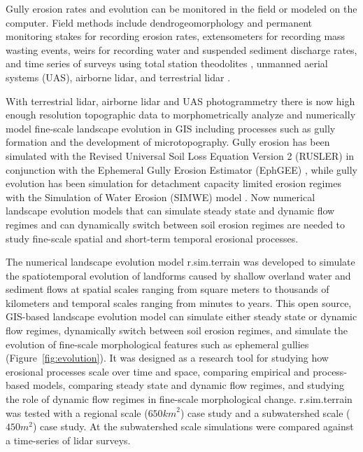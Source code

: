 \documentclass[esurf, manuscript]{copernicus}
\begin{document}
Gully erosion rates and evolution
can be monitored in the field 
or modeled on the computer. 
Field methods include
dendrogeomorphology \citep{Malik2008} and 
permanent monitoring stakes for recording erosion rates, 
extensometers for recording mass wasting events, 
weirs for recording water and suspended sediment discharge rates, 
and time series of surveys using 
total station theodolites \citep{Thomas2004},
unmanned aerial systems (UAS),
airborne lidar, and terrestrial lidar \citep{Starek2011,Bechet2016}.

With terrestrial lidar, airborne lidar and 
UAS photogrammetry
there is now high enough resolution topographic data 
to morphometrically analyze and 
numerically model fine-scale landscape evolution in GIS
including processes such as gully formation 
and the development of microtopography. 
Gully erosion has been simulated with 
the Revised Universal Soil Loss Equation Version 2 (RUSLER)
in conjunction with the Ephemeral Gully Erosion Estimator (EphGEE)
\citep{Dabney2014},
while gully evolution
has been simulation for detachment capacity limited erosion regimes
with the Simulation of Water Erosion (SIMWE) model
\citep{Koco2011, Mitasova2013}. 
Now numerical landscape evolution models 
that can simulate 
steady state and dynamic flow regimes
and can dynamically switch between soil erosion regimes 
are needed to study 
fine-scale spatial and short-term temporal erosional processes.

The numerical landscape evolution model 
\lowercase{r.sim.terrain} was developed to 
simulate the spatiotemporal evolution of landforms
caused by shallow overland water and sediment flows
at spatial scales ranging from
square meters to thousands of kilometers
and temporal scales ranging from minutes to years. 
This open source, GIS-based landscape evolution model can
simulate either steady state or dynamic flow regimes, 
dynamically switch between soil erosion regimes, and
simulate the evolution of fine-scale morphological features 
such as ephemeral gullies
(Figure~\ref{fig:evolution}).
It was designed as a research tool for
studying how erosional processes scale over time and space,
comparing empirical and process-based models, 
comparing steady state and dynamic flow regimes, and
studying the role of dynamic flow regimes in fine-scale morphological change. 
\lowercase{r.sim.terrain} was tested with a regional scale ($650 \unit{km}^{2}$) case study
and a subwatershed scale ($450 \unit{m}^{2}$) case study. 
At the subwatershed scale simulations were compared against 
a time-series of lidar surveys.
\end{document}
